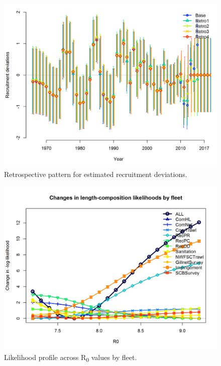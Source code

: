 \documentclass[12pt,]{article}
\begin{document}
\FloatBarrier

\begin{figure}[htbp]
\centering
\includegraphics{Figures/retro_recdev.png}
\caption{Retrospective pattern for estimated recruitment deviations.
\label{fig:retro_recdev}}
\end{figure}

\begin{figure}[htbp]
\centering
\includegraphics{Figures/profile_R0_piner.png}
\caption{Likelihood profile across R\textsubscript{0} values by fleet.
\label{fig:profile_R0_piner}}
\end{figure}
\end{document}
